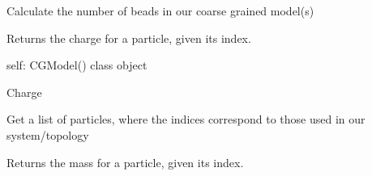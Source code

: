 \documentclass[letterpaper,12pt,english,openany,oneside]{sphinxmanual}
\begin{document}
\begin{fulllineitems}
\begin{fulllineitems}
\end{fulllineitems}


\begin{fulllineitems}
\label{\detokenize{cg_model:cg_model.cgmodel.CGModel.get_num_beads}}
Calculate the number of beads in our coarse grained model(s)

\end{fulllineitems}


\begin{fulllineitems}
\label{\detokenize{cg_model:cg_model.cgmodel.CGModel.get_particle_charge}}
Returns the charge for a particle, given its index.

self: CGModel() class object

Charge

\end{fulllineitems}


\begin{fulllineitems}
\label{\detokenize{cg_model:cg_model.cgmodel.CGModel.get_particle_list}}
Get a list of particles, where the indices correspond to those used in our system/topology

\end{fulllineitems}


\begin{fulllineitems}
\label{\detokenize{cg_model:cg_model.cgmodel.CGModel.get_particle_mass}}
Returns the mass for a particle, given its index.


\end{fulllineitems}
\end{fulllineitems}
\end{document}
